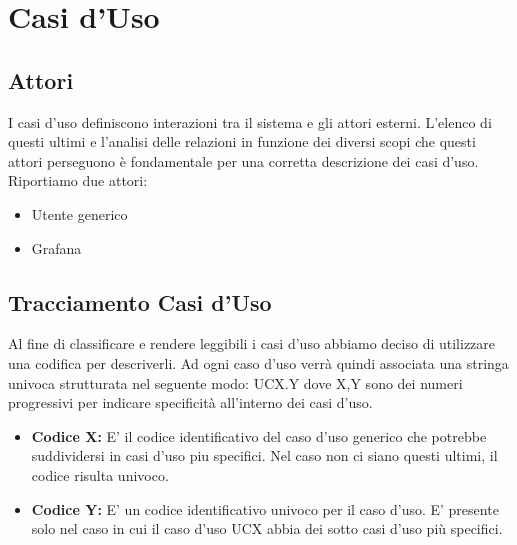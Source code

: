 \section{Casi d'Uso}
		\subsection{Attori}			
        I casi d'uso definiscono interazioni tra il sistema e gli attori esterni. L'elenco di questi ultimi e l'analisi delle relazioni in funzione dei diversi scopi che questi attori perseguono è fondamentale per una corretta descrizione dei casi d'uso.
        Riportiamo due attori:
        \begin{itemize}
            \item Utente generico
            \item Grafana
        \end{itemize}


		\subsection{Tracciamento Casi d'Uso}
        Al fine di classificare e rendere leggibili i casi d'uso abbiamo deciso di utilizzare una codifica per descriverli. Ad ogni caso d'uso verrà quindi associata una stringa univoca strutturata nel seguente modo: UCX.Y  dove X,Y sono dei numeri progressivi per indicare specificità all'interno dei casi d'uso.
        \begin{itemize}
        \item \textbf{Codice X:} E' il codice identificativo del caso d'uso generico che potrebbe suddividersi in casi d'uso piu specifici. Nel caso non ci siano questi ultimi, il codice risulta univoco. 
        \item \textbf{Codice Y:} E' un codice identificativo univoco per il caso d'uso. E' presente solo nel caso in cui il caso d'uso UCX abbia dei sotto casi d'uso più specifici.
        \end{itemize}
        
